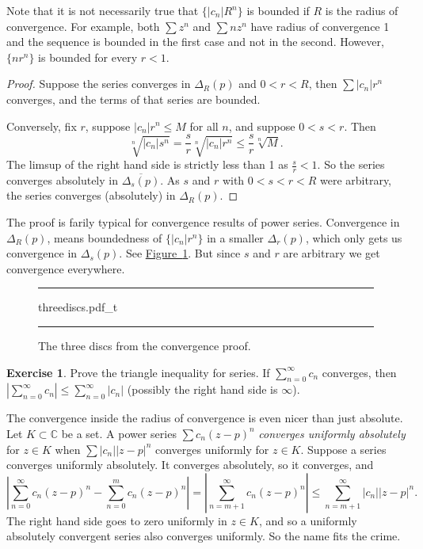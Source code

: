 \documentclass[12pt,openany]{book}
\newcommand{\sabs}[1]{\lvert {#1} \rvert}
\newcommand{\abs}[1]{\left\lvert {#1} \right\rvert}
\newcommand{\C}{{\mathbb{C}}}
\newcommand{\myindex}[1]{#1\index{#1}}
\theoremstyle{plain}
\theoremstyle{remark}
\theoremstyle{definition}
\newenvironment{exbox}{%
    \def\FrameCommand{\vrule width 1pt \relax\hspace {10pt}}%
    \MakeFramed {\advance \hsize -\width \FrameRestore }%
}{%
    \endMakeFramed
}
\newenvironment{myfig}{%
\begin{figure}[h!t]
\noindent\rule{\textwidth}{0.4pt}\vspace{12pt}\par\centering}%
{\par\noindent\rule{\textwidth}{0.4pt}
\end{figure}}
\theoremstyle{exercise}
\newtheorem{exercise}{Exercise}[section]
\theoremstyle{example}
\newcommand{\figureref}[1]{\hyperref[#1]{Figure~\ref*{#1}}}
\begin{document}
Note that it is not necessarily true that $\bigl\{ \sabs{c_n} R^n \bigr\}$
is bounded if $R$ is the radius of convergence.
For example, both $\sum z^n$ and $\sum n z^n$ have
radius of convergence 1 and the sequence is bounded in the first case and
not in the second.  However, $\{ n r^n \}$ is bounded for every $r < 1$.

\begin{proof}
Suppose the series converges in $\Delta_{R}(p)$ and
$0 < r < R$, then $\sum \sabs{c_n}r^n$ converges,
and the terms of that series are bounded.

Conversely, fix $r$, suppose 
$\sabs{c_n} r^n \leq M$ for all $n$, and suppose $0 < s < r$.
Then
\begin{equation*}
\sqrt[n]{\sabs{c_n} s^n}=
\frac{s}{r}\sqrt[n]{\sabs{c_n} r^n} \leq \frac{s}{r} \sqrt[n]{M} .
\end{equation*}
The limsup of the right hand side is strictly less than 1 as $\frac{s}{r} < 1$.
So the series converges absolutely in
$\overline{\Delta_s(p)}$.  As $s$ and $r$ with $0 < s < r < R$ were
arbitrary,
the series converges (absolutely) in $\Delta_R(p)$.
\end{proof}

The proof is farily typical for convergence results of power series.
Convergence in $\Delta_R(p)$, means boundedness of
$\{ \sabs{c_n} r^n \}$ in a smaller $\Delta_r(p)$, which only gets us convergence
in $\Delta_s(p)$.  See \figureref{fig:threediscs}.  But since $s$ and $r$
are arbitrary we get convergence everywhere.
\begin{myfig}
{threediscs.pdf_t}
\caption{The three discs from the convergence proof.\label{fig:threediscs}}
\end{myfig}

\begin{exbox}
\begin{exercise}
Prove the triangle inequality for series.  If $\sum_{n=0}^\infty c_n$
converges, then $\abs{\sum_{n=0}^\infty c_n} \leq \sum_{n=0}^\infty
\sabs{c_n}$ (possibly the right hand side is $\infty$).
\end{exercise}
\end{exbox}

The convergence inside the radius of convergence is even nicer than just absolute.
Let $K \subset \C$ be a set.
A power series $\sum c_n {(z-p)}^n$
\emph{\myindex{converges uniformly absolutely}}
for $z \in K$ when $\sum \sabs{c_n} \sabs{z-p}^n$
converges uniformly for $z \in K$.
Suppose a series converges uniformly absolutely.  It converges absolutely,
so it converges, and 
\begin{equation*}
\abs{
\sum_{n=0}^\infty c_n {(z-p)}^n
-
\sum_{n=0}^{m} c_n {(z-p)}^n
}
=
\abs{\sum_{n=m+1}^\infty c_n {(z-p)}^n} \leq
\sum_{n=m+1}^\infty \sabs{c_n} \sabs{z-p}^n .
\end{equation*}
The right hand side goes to zero uniformly in $z \in K$,
and so
a uniformly absolutely convergent series also converges
uniformly.  So the name fits the crime.
\end{document}
